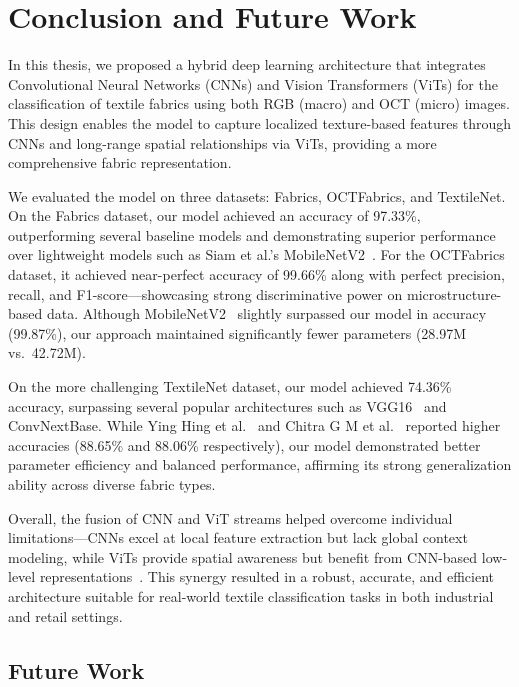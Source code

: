 \section{Conclusion and Future Work}

In this thesis, we proposed a hybrid deep learning architecture that integrates Convolutional Neural Networks (CNNs) and Vision Transformers (ViTs) for the classification of textile fabrics using both RGB (macro) and OCT (micro) images. This design enables the model to capture localized texture-based features through CNNs and long-range spatial relationships via ViTs, providing a more comprehensive fabric representation.

We evaluated the model on three datasets: Fabrics, OCTFabrics, and TextileNet. On the Fabrics dataset, our model achieved an accuracy of 97.33\%, outperforming several baseline models and demonstrating superior performance over lightweight models such as Siam et al.'s MobileNetV2~\cite{siam2023textilenet}. For the OCTFabrics dataset, it achieved near-perfect accuracy of 99.66\% along with perfect precision, recall, and F1-score—showcasing strong discriminative power on microstructure-based data. Although MobileNetV2~\cite{siam2023textilenet} slightly surpassed our model in accuracy (99.87\%), our approach maintained significantly fewer parameters (28.97M vs.\ 42.72M).

On the more challenging TextileNet dataset, our model achieved 74.36\% accuracy, surpassing several popular architectures such as VGG16~\cite{simonyan2015vgg} and ConvNextBase. While Ying Hing et al.~\cite{hong2024research} and Chitra G M et al.~\cite{chitra2023fabric} reported higher accuracies (88.65\% and 88.06\% respectively), our model demonstrated better parameter efficiency and balanced performance, affirming its strong generalization ability across diverse fabric types.

Overall, the fusion of CNN and ViT streams helped overcome individual limitations—CNNs excel at local feature extraction but lack global context modeling, while ViTs provide spatial awareness but benefit from CNN-based low-level representations~\cite{dosovitskiy2020vit}. This synergy resulted in a robust, accurate, and efficient architecture suitable for real-world textile classification tasks in both industrial and retail settings.

\subsection*{Future Work}

